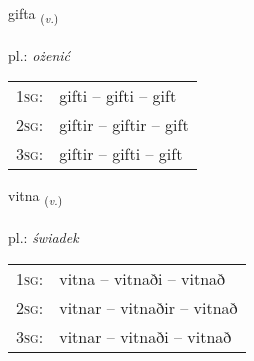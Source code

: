 \documentclass[frontgrid, backgrid]{flacards}\usepackage[]{graphicx}\usepackage[]{xcolor}
\begin{document}
\renewcommand{\blhead}{\vskip5pt {\small\bfseries\footnotesize Sagnorð | Verb }}
\renewcommand{\bcfoot}{\vskip5pt \hspace{2pt}{\small\bfseries\footnotesize 2K}}


{gifta \small{\textsubscript{(\textit{v.})}} \\[1ex] %
\textphonetic{[cɪfta]} \\
pl.: \emph{ożenić} \\  [2ex]
\renewcommand*{\arraystretch}{0.8}
\begin{tabular}{p{1cm}l}
\textsc{1sg}: & gifti -- gifti -- gift \\ 
\textsc{2sg}: & giftir -- giftir -- gift \\ 
\textsc{3sg}: & giftir -- gifti -- gift \\ 
\end{tabular}
}

\renewcommand{\flhead}{\vskip5pt \fboxsep=0pt {\small\bfseries\footnotesize Sagnorð | Verb}}
\renewcommand{\fcfoot}{\vskip5pt \fboxsep=0pt \hspace{2pt}{\small\bfseries\footnotesize 2K}}

\renewcommand{\blhead}{\vskip5pt {\small\bfseries\footnotesize Sagnorð | Verb }}
\renewcommand{\bcfoot}{\vskip5pt \hspace{2pt}{\small\bfseries\footnotesize 2K}}


{vitna \small{\textsubscript{(\textit{v.})}} \\[1ex] %
\textphonetic{[vɪhtna]} \\
pl.: \emph{świadek} \\  [2ex]
\renewcommand*{\arraystretch}{0.8}
\begin{tabular}{p{1cm}l}
\textsc{1sg}: & vitna -- vitnaði -- vitnað \\ 
\textsc{2sg}: & vitnar -- vitnaðir -- vitnað \\ 
\textsc{3sg}: & vitnar -- vitnaði -- vitnað \\ 
\end{tabular}
}
\end{document}
